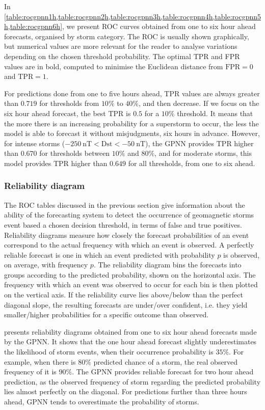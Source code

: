 In \cref{table:rocgpnn1h,table:rocgpnn2h,table:rocgpnn3h,table:rocgpnn4h,table:rocgpnn5h,table:rocgpnn6h}, we 
present ROC curves obtained from one to six hour ahead forecasts, organised by storm category. 
The ROC is usually shown graphically, but numerical values are more relevant for the reader to analyse 
variations depending on the chosen threshold probability. The optimal TPR and FPR values are in bold, computed to 
minimise the Euclidean distance from $\text{FPR} = 0$ and $\text{TPR} = 1$.

For predictions done from one to five hours ahead, TPR values are always greater than $0.719$ for thresholds from 
$10\%$  to $40\%$, and then decrease. If we focus on the six hour ahead forecast, the best TPR is $0.5$ 
for a $10\%$ threshold. It means that the more there is an increasing probability for a superstorm to occur, 
the less the model is able to forecast it without misjudgments, six hours in advance. However, for intense storms 
($\SI{-250}{\nano\tesla} < \mathrm{Dst} < \SI{-50}{\nano\tesla}$), the GPNN provides TPR higher than $0.670$ 
for thresholds between $10\%$ and $80\%$, and for moderate storms, this model provides TPR higher than $0.649$ for all 
thresholds, from one to six ahead. 


\subsubsection{Reliability diagram}


The ROC tables discussed in the previous section give information about the ability of the forecasting system to 
detect the occurrence of geomagnetic storms event based a chosen decision threshold, in terms of false and 
true positives. Reliability diagrams measure how closely the forecast probabilities of an event correspond to the actual 
frequency with which an event is observed. A perfectly reliable forecast is one in which an event predicted 
with probability $p$ is observed, on average, with frequency $p$. The reliability diagram bins the forecasts into 
groups according to the predicted probability, shown on the horizontal axis. The frequency with which an event was 
observed to occur for each bin is then plotted on the vertical axis. If the reliability curve lies above/below 
than the perfect diagonal slope, the resulting forecasts are under/over confident, i.e. they yield  
smaller/higher probabilities for a specific outcome than observed. 

 presents reliability diagrams obtained from one to six hour ahead forecasts made 
by the GPNN. It shows that the one hour ahead forecast slightly underestimates the likelihood of storm events, 
when their occurrence probability is $35\%$. For example, when there is $80\%$ predicted chance of a storm, 
the real observed frequency of it is $90\%$. The GPNN provides reliable forecast for two hour ahead prediction, 
as the observed frequency of storm regarding the predicted probability lies almost perfectly on the diagonal. 
For predictions further than three hours ahead, GPNN tends to overestimate the probability of storms. 

